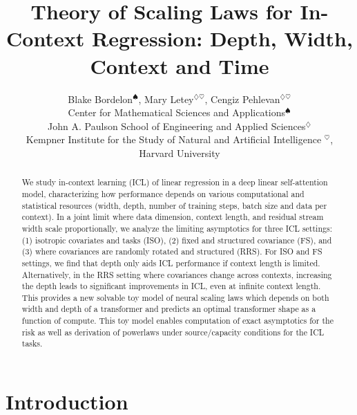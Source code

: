 \documentclass{article} %
\title{Theory of Scaling Laws for In-Context Regression: Depth, Width, Context and Time}
\author{Blake Bordelon$^\spadesuit$, Mary Letey$^{\diamondsuit \heartsuit}$, Cengiz Pehlevan$^{\diamondsuit \heartsuit}$
\\
Center for Mathematical Sciences and Applications$^\spadesuit$
\\
John A. Paulson School of Engineering and Applied Sciences$^\diamondsuit$
\\
Kempner Institute for the Study of Natural and Artificial Intelligence $^{\heartsuit}$,
\\
Harvard University
}
\begin{document}
\maketitle
\vspace{-5pt}
\begin{abstract}
We study in-context learning (ICL) of linear regression in a deep linear self-attention model, characterizing how performance depends on various computational and statistical resources (width, depth, number of training steps, batch size and data per context). In a joint limit where data dimension, context length, and residual stream width scale proportionally, we analyze the limiting asymptotics for three ICL settings: (1) isotropic covariates and tasks (ISO), (2) fixed and structured covariance (FS), and (3) where covariances are randomly rotated and structured (RRS). For ISO and FS settings, we find that depth only aids ICL performance if context length is limited. Alternatively, in the RRS setting where covariances change across contexts, increasing the depth leads to significant improvements in ICL, even at infinite context length. This provides a new solvable toy model of neural scaling laws which depends on both width and depth of a transformer and predicts an optimal transformer shape as a function of compute. This toy model enables computation of exact asymptotics for the risk as well as derivation of powerlaws under source/capacity conditions for the ICL tasks. 
\end{abstract}

\vspace{-25pt}
\section{Introduction}
\vspace{-12pt}
\end{document}
